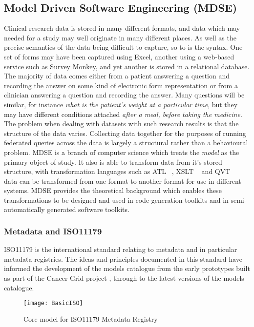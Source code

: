 \subsection{Model Driven Software Engineering (MDSE)}

Clinical research data is stored in many different formats, and data
which may needed for a study may well originate in many different
places. As well as the precise semantics of the data being difficult
to capture, so to is the syntax. One set of forms may have been
captured using Excel, another using a web-based service such as Survey
Monkey, and yet another is stored in a relational database. The
majority of data comes either from a patient answering a question and
recording the answer on some kind of electronic form representation or
from a clinician answering a question and recording the answer. Many
questions will be similar, for instance \emph{what is the patient's
  weight at a particular time}, but they may have different conditions
attached \emph{after a meal, before taking the medicine}. The problem
when dealing with datasets with such research results is that the
structure of the data varies. Collecting data together for the
purposes of running federated queries across the data is largely a
structural rather than a behavioural problem. MDSE is a branch of
computer science which treats the \emph{model} as the primary object
of study. It also is able to transform data from it's stored
structure, with transformation languages such as ATL ~\cite{ATL}, XSLT
~\cite{XSLT} and QVT ~\cite{QVT} data can be transformed from one
format to another format for use in different systems. MDSE provides
the theoretical background which enables these transformations to be
designed and used in code generation toolkits and in
semi-automatically generated software toolkits.

\subsubsection{Metadata and ISO11179}
ISO11179 is the international standard relating to metadata and in particular metadata registries. The ideas and principles documented in this standard have informed the development of the models catalogue from the early prototypes built as part of the Cancer Grid project \cite{crichton2009metadata}, through to the latest versions of the models catalogue.

\begin{figure}[here]
	\texttt{[image: BasicISO]}
	\caption{Core model for ISO11179 Metadata Registry} 
	\label{fig:basicMDR}
\end{figure}

